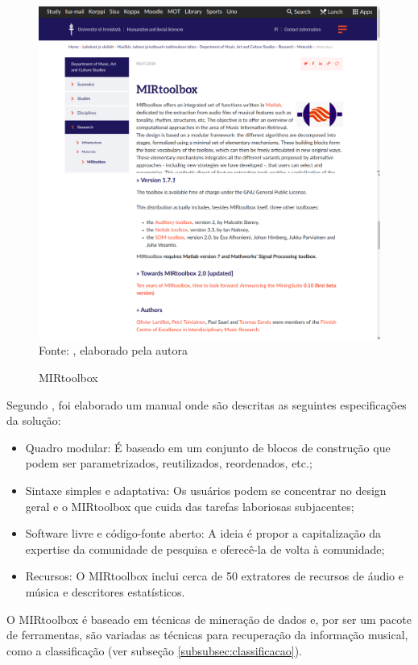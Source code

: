 \begin{figure}[!htb]
   \centering
   \caption{MIRtoolbox}\label{fig:mirtoolbox} 
   \includegraphics[scale=0.25]{figuras/mirtoolbox.png}
   \\Fonte: \cite{mirtoolbox}, elaborado pela autora
\end{figure}

Segundo , foi elaborado um manual onde são descritas as seguintes especificações da solução:

\begin{itemize}
    \item Quadro modular: É baseado em um conjunto de blocos de construção que podem ser parametrizados, reutilizados, reordenados, etc.;
    \item Sintaxe simples e adaptativa: Os usuários podem se concentrar no design geral e o MIRtoolbox que cuida das tarefas laboriosas subjacentes;
    \item Software livre e código-fonte aberto: A ideia é propor a capitalização da expertise da comunidade de pesquisa e oferecê-la de volta à comunidade;
    \item Recursos: O MIRtoolbox inclui cerca de 50 extratores de recursos de áudio e música e descritores estatísticos.
\end{itemize}

O MIRtoolbox é baseado em técnicas de mineração de dados e, por ser um pacote de ferramentas, são variadas as técnicas para recuperação da informação musical, como a classificação (ver subseção \ref{subsubsec:classificacao}).


